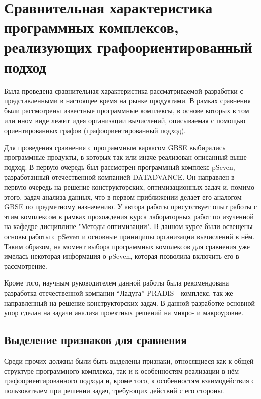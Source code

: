 \chapter{Сравнительная характеристика программных комплексов, реализующих графоориентированный подход}
Была проведена сравнительная характеристика рассматриваемой разработки с представленными в настоящее время на рынке продуктами.
В рамках сравнения были рассмотрены известные программные комплексы, в основе которых в том или ином виде лежит идея организации вычислений, описываемая с помощью ориентированных графов (графоориентированный подход).

Для проведения сравнения с программным каркасом GBSE выбирались программные продукты, в которых так или иначе реализован описанный выше подход. В первую очередь был рассмотрен программный комплекс pSeven, разработанный отечественной компанией DATADVANCE. Он направлен в первую очередь на решение конструкторских, оптимизационных задач и, помимо этого, задач анализа данных, что в первом приближении делает его аналогом GBSE по предметному назначению. У автора работы присутствует опыт работы с этим комплексом в рамках прохождения курса лабораторных работ по изученной на кафедре дисциплине "Методы оптимизации". В данном курсе были освещены основы работы с pSeven и основные приниципы организации вычислений в нём. Таким образом, на момент выбора программных комплексов для сравнения уже имелась некоторая информация о pSeven, которая позволила включить его в рассмотрение.

Кроме того, научным руководителем данной работы была рекомендована разработка отечественной компании ``Ладуга'' PRADIS - комплекс, так же направленный на решение конструкторских задач. В данной разработке основной упор сделан на задачи анализа проектных решений на микро- и макроуровне.

\section{Выделение признаков для сравнения}


Среди прочих должны были быть выделены признаки, относящиеся как к общей структуре программного комплекса, так и к особенностям реализации в нём графоориентированного подхода и, кроме того, к особенностям взаимодействия с пользователем при решении задач, требующих действий с его стороны.

